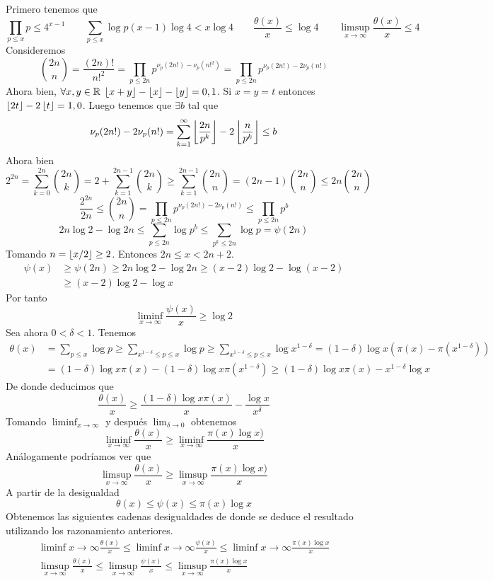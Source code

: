 \documentclass[TAN.tex]{subfiles}
\begin{document}
\begin{dem}
Primero tenemos que
$$
\prod_{p\leq x}p\leq 4^{x-1} \qquad \sum_{p\leq x}\log p (x-1)\log 4 <  x \log 4 \qquad \frac{\theta(x)}{x} \leq \log 4 \qquad \limsup_{x\to\infty} \frac{\theta(x)}{x} \leq 4
$$
Consideremos 
$$
\binom{2n}{n} =  \frac{(2n)!}{n!^2} = \prod_{p\leq 2n} p^{\nu_p(2n!)-\nu_p(n!^2)} = \prod_{p\leq 2n} p^{\nu_p(2n!)-2\nu_p(n!)}
$$
Ahora bien, $\forall x,y \in \mathbb{R}$ $\left\lfloor{x+y}\right\rfloor-\left\lfloor{x}\right\rfloor-\left\lfloor{y}\right\rfloor=0,1$. Si $x=y=t$ entonces $\left\lfloor{2t}\right\rfloor-2\left\lfloor{t}\right\rfloor=1,0$. Luego tenemos que $\exists b$ tal que
$$
\nu_p(2n!)-2\nu_p(n!) = \sum_{k=1}^\infty \left\lfloor{\frac{2n}{p^k}}\right\rfloor-2\left\lfloor{\frac{n}{p^k}}\right\rfloor  \leq b
$$
Ahora bien 
$$
2^{2n}=\sum_{k=0}^{2n} \binom{2n}{k} = 2 + \sum_{k=1}^{2n-1} \binom{2n}{k} \geq \sum_{k=1}^{2n-1} \binom{2n}{n} = (2n-1)\binom{2n}{n} \leq 2n\binom{2n}{n} 
$$
$$
 \frac{2^{2n}}{2n} \leq \binom{2n}{n} =  \prod_{p\leq 2n} p^{\nu_p(2n!)-2\nu_p(n!)} \leq \prod_{p\leq 2n} p^b $$
 $$
  2n\log 2 -\log 2n \leq \sum_{p\leq 2n}\log p^b \leq \sum_{p^k\leq 2n}\log p= \psi(2n)
$$
Tomando $n=\left\lfloor{x/2}\right\rfloor\geq 2$. Entonces $2n\leq x < 2n+2$.
\begin{align*}
\psi(x)&\geq \psi(2n) \geq 2n\log 2-\log 2n \geq (x-2)\log 2-\log (x-2)\\
&\geq (x-2)\log 2 - \log x
\end{align*}
Por tanto
$$
\liminf_{x\to\infty} \frac{\psi(x)}{x}\geq \log 2
$$
Sea ahora $0<\delta < 1$. Tenemos
\begin{align*}
\theta(x)&=\sum_{p\leq x}\log p\geq\sum_{x^{1-\delta}\leq p\leq x} \log p \geq \sum_{x^{1-\delta}\leq p\leq x}\log x^{1-\delta}  = (1-\delta)\log x(\pi(x)-\pi(x^{1-\delta}))\\
&=(1-\delta)\log x\pi(x)-(1-\delta)\log x \pi(x^{1-\delta}) \geq (1-\delta)\log x \pi(x)- x^{1-\delta}\log x
\end{align*}
De donde deducimos que
$$
\frac{\theta(x)}{x} \geq \frac{(1-\delta)\log x \pi(x)}{x}-\frac{\log x}{x^{\delta}}
$$
Tomando $\liminf_{x\to\infty}$ y después $\lim_{\delta \to 0}$ obtenemos
$$
\liminf_{x\to\infty}\frac{\theta(x)}{x}\geq \liminf_{x\to\infty}\frac{\pi(x)\log x)}{x}
$$
Análogamente podríamos ver que
$$
\limsup_{x\to\infty}\frac{\theta(x)}{x}\geq \limsup_{x\to\infty}\frac{\pi(x)\log x)}{x}
$$
A partir de la desigualdad
$$
\theta(x)\leq \psi(x) \leq \pi(x)\log x 
$$
Obtenemos las siguientes cadenas desigualdades de donde se deduce el resultado utilizando los razonamiento anteriores.
\begin{gather*}
\liminf{x\to\infty} \frac{\theta(x)}{x} \leq \liminf{x\to\infty} \frac{\psi(x)}{x} \leq \liminf{x\to\infty}\frac{\pi(x)\log x}{x}\\
\limsup_{x\to\infty} \frac{\theta(x)}{x} \leq \limsup_{x\to\infty} \frac{\psi(x)}{x} \leq \limsup_{x\to\infty}\frac{\pi(x)\log x}{x}
\end{gather*}
\end{dem}
\newpage
\end{document}
